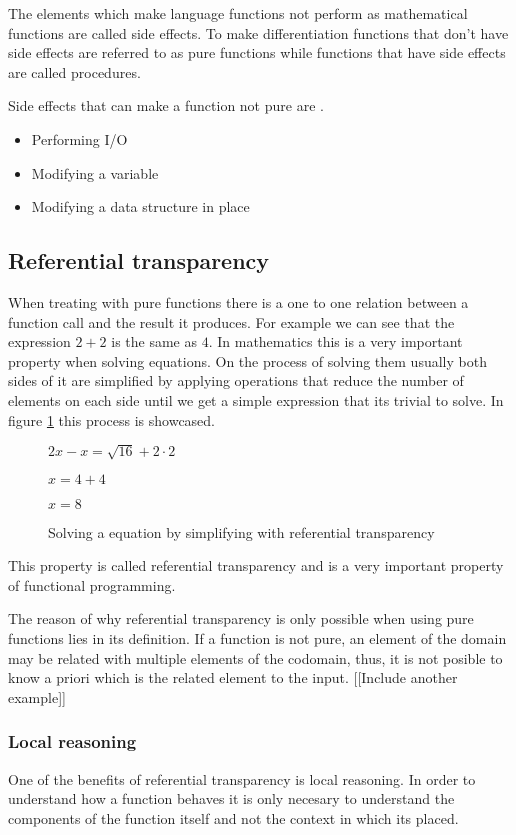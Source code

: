\documentclass[../main.tex]{subfiles}
\begin{document}
The elements which make language functions not perform as mathematical functions
are called side effects. To make differentiation functions that don't have side
effects are referred to as pure functions\autocite{UsingAttributes} while
functions that have side effects are called procedures.

Side effects that can make a function not pure are
\autocite{SpulerCompilerEffects}.

\begin{itemize}
  \item Performing I/O
  \item Modifying a variable
  \item Modifying a data structure in place
\end{itemize}

\subsection{Referential transparency} When treating with pure functions there is
a one to one relation between a function call and the result it produces. For
example we can see that the expression $2 + 2$ is the same as $4$. In
mathematics this is a very important property when solving equations. On the
process of solving them usually both sides of it are simplified by applying
operations that reduce the number of elements on each side until we get a simple
expression that its trivial to solve. In figure \ref{fig:refequation} this
process is showcased.

\begin{figure}[ht]
  \centering
  $ 2x - x = \sqrt{16} + 2 \cdot 2$

  $ x = 4 + 4$

  $ x = 8 $
  \caption{\label{fig:refequation} Solving a equation by simplifying with
    referential transparency}
\end{figure}


This property is called referential transparency
\autocite{Strachey2000FundamentalLanguages} and is a very important property of
functional programming.

The reason of why referential transparency is only possible when using pure
functions lies in its definition. If a function is not pure, an element of the
domain may be related with multiple elements of the codomain, thus, it is not
posible to know a priori which is the related element to the input. [[Include
another example]]

\subsubsection{Local reasoning} One of the benefits of referential transparency
is local reasoning. In order to understand how a function behaves it is only
necesary to understand the components of the function itself and not the context
in which its placed.
\end{document}
